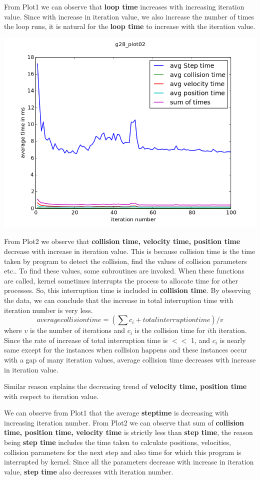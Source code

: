 \documentclass[11pt]{article}
\begin{document}
From Plot1 we can observe that {\bf loop time} increases with increasing iteration value. Since with increase in iteration value, we also increase the number of times the loop runs, it is natural for the {\bf loop time} to increase with the iteration value. 

\centerline{
\includegraphics[scale = 0.5]{g28_plot02.png}
}


From Plot2 we observe that {\bf collision time, velocity time, position time} decrease with increase in iteration value. This is because collision time is the time taken by program to detect the collision, find the values of collision parameters etc.. To find these values, some subroutines are invoked. When these functions are called, kernel sometimes interrupts the process to allocate time for other processes. So, this interruption time is included in {\bf collision time}.  By observing the data, we can conclude that the increase in total interruption time with iteration number is very less.
$$average collision time = \left(\sum c_i +  total interruption time\right)/v$$ where $v$ is the number of iterations and $c_i$ is the collision time for $i$th iteration. Since the rate of increase of total interruption time  is $<<$ 1, and $c_i$ is nearly same except for the instances when collision happens and these instances occur with a gap of many iteration values, average collision time decreases with increase in iteration value.
 
Similar reason explains the decreasing trend of {\bf velocity time, position time} with respect to iteration value.


We can observe from Plot1 that the average {\bf steptime} is decreasing with increasing iteration number. From Plot2 we can observe that sum of {\bf collision time, position time, velocity time} is strictly less than {\bf step time}, the reason being {\bf step time} includes the time taken to calculate positions, velocities, collision parameters for the next step and also time for which this program is interrupted by kernel. Since all the parameters decrease with increase in iteration value, {\bf step time} also decreases with iteration number.
\end{document}
